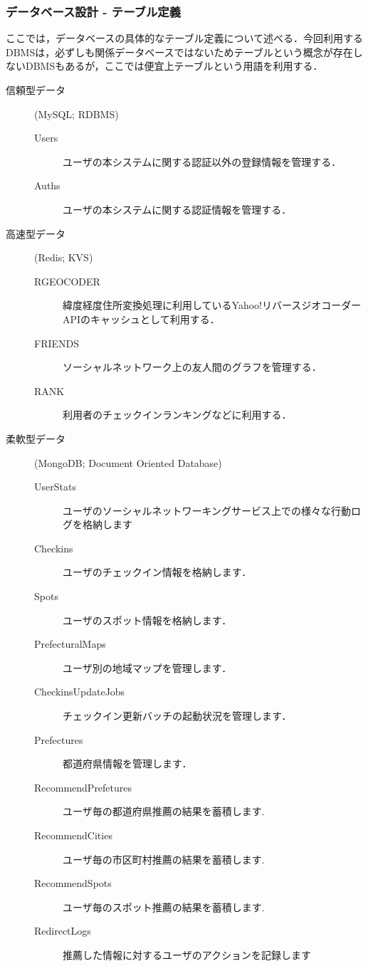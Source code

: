 \documentclass{jsarticle}
\begin{document}
\subsubsection{データベース設計 - テーブル定義}

ここでは，データベースの具体的なテーブル定義について述べる．今回利用するDBMSは，必ずしも関係データベースではないためテーブルという概念が存在しないDBMSもあるが，ここでは便宜上テーブルという用語を利用する．

\begin{description}
    \item[信頼型データ] (MySQL; RDBMS)
        \begin{description}
            \item[Users] ユーザの本システムに関する認証以外の登録情報を管理する．
            \item[Auths] ユーザの本システムに関する認証情報を管理する．
        \end{description}
    \item[高速型データ] (Redis; KVS)
        \begin{description}
            \item[RGEOCODER] 緯度経度住所変換処理に利用しているYahoo!リバースジオコーダーAPI\cite{yolp_rgc}のキャッシュとして利用する．
            \item[FRIENDS]  ソーシャルネットワーク上の友人間のグラフを管理する．
            \item[RANK]     利用者のチェックインランキングなどに利用する．
        \end{description}
    \item[柔軟型データ] (MongoDB; Document Oriented Database)
        \begin{description}
            \item[UserStats] ユーザのソーシャルネットワーキングサービス上での様々な行動ログを格納します
            \item[Checkins] ユーザのチェックイン情報を格納します．
            \item[Spots] ユーザのスポット情報を格納します．
            \item[PrefecturalMaps] ユーザ別の地域マップを管理します．
            \item[CheckinsUpdateJobs] チェックイン更新バッチの起動状況を管理します．
            \item[Prefectures] 都道府県情報を管理します．
            \item[RecommendPrefetures] ユーザ毎の都道府県推薦の結果を蓄積します.
            \item[RecommendCities] ユーザ毎の市区町村推薦の結果を蓄積します.
            \item[RecommendSpots] ユーザ毎のスポット推薦の結果を蓄積します.
            \item[RedirectLogs] 推薦した情報に対するユーザのアクションを記録します
        \end{description}
\end{description}
\end{document}
